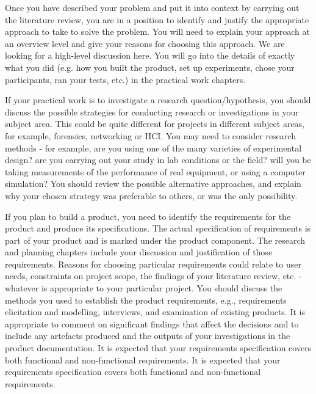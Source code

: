 {    Once you have described your problem and put it into context by carrying out the literature review, you are in a position to identify and justify the appropriate approach
    to take to solve the problem. You will need to explain your approach at an overview level and give your reasons for choosing this approach. We are looking for a
    high-level discussion here. You will go into the details of exactly what you did (e.g. how you built the product, set up experiments, chose your participants, ran your
    tests, etc.) in the practical work chapters.

    If your practical work is to investigate a research question/hypothesis, you should discuss the possible strategies for conducting research or
    investigations in your subject area. This could be quite different for projects in different subject areas, for example, forensics, networking or HCI. You may need to
    consider research methods - for example, are you using one of the many varieties of experimental design? are you carrying out your study in lab conditions or the
    field? will you be taking measurements of the performance of real equipment, or using a computer simulation? You should review the possible alternative approaches, and
    explain why your chosen strategy was preferable to others, or was the only possibility.

    If you plan to build a product, you need to identify the requirements for the product and produce its specifications. The actual specification of requirements is part
    of your product and is marked under the product component. The research and planning chapters include your discussion and justification of those requirements. Reasons
    for choosing particular requirements could relate to user needs, constraints on project scope, the findings of your literature review, etc. - whatever is appropriate
    to your particular project. You should discuss the methods you used to establish the product requirements, e.g., requirements elicitation and modelling, interviews,
    and examination of existing products. It is appropriate to comment on significant findings that affect the decisions and to include any artefacts produced and the outputs
    of your investigations in the product documentation. It is expected that your requirements specification covers both functional and non-functional requirements. It is
    expected that your requirements specification covers both functional and non-functional requirements.

}
